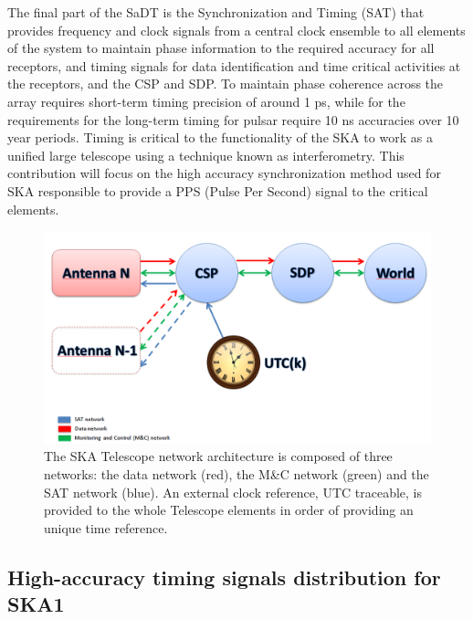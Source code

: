 The final part of the SaDT is the Synchronization and Timing (SAT) that provides frequency and clock signals from a central clock ensemble to all elements of the system to maintain phase information to the required accuracy for all receptors, and timing signals for data identification and time critical activities at the receptors, and the CSP and SDP. To maintain phase coherence across the array requires short-term timing precision of around 1 ps, while for the requirements for the long-term timing for pulsar require 10 ns accuracies over 10 year periods. Timing is critical to the functionality of the SKA to work as a unified large telescope using a technique known as interferometry. This contribution will focus on the high accuracy synchronization method used for SKA responsible to provide a PPS (Pulse Per Second) signal to the critical elements. 

\begin{figure}[H]
	\centering
	\includegraphics[scale=0.4]{img/ska_network_arch}
	\caption{The SKA Telescope network architecture is composed of three networks: the data network (red), the M\&C network (green) and the SAT network (blue). An external clock reference, UTC traceable, is provided to the whole Telescope elements in order of providing an unique time reference.}
	\label{fig:ska_net_arch1}
\end{figure}


\subsection{High-accuracy timing signals distribution for SKA1} \label{subsec:ska-distribution}


